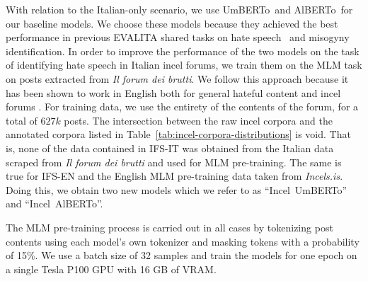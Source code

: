 \documentclass[11pt]{article}
\newcommand{\abc}[1]{{\color{blue} #1}}
\newcommand{\todoA}[1]{\todo[color=blue!40]{A: #1}}
\newcommand{\dsENclassification}{IFS-EN}
\newcommand{\dsITclassification}{IFS-IT}
\newcommand{\umbert}{\mbox{UmBERTo}}
\newcommand{\albert}{\mbox{AlBERTo}}
\newcommand{\iumbert}{\mbox{Incel UmBERTo}}
\newcommand{\ialbert}{\mbox{Incel AlBERTo}}
\newcommand{\enforum}{\textit{Incels.is}}
\newcommand{\itforum}{\textit{Il forum dei brutti}}
\begin{document}
With relation to the Italian-only scenario, we use \umbert\, and \albert\, for our baseline models. We choose these models because they achieved the best performance in previous EVALITA shared tasks on hate speech~\cite{basileEVALITA2020Overview} and misogyny~\cite{fersiniAMIEVALITA2020Automatic2020} identification.
In order to improve the performance of the two models on the task of identifying hate speech in Italian incel forums, we train them on the MLM task on posts extracted from \itforum. We follow this approach because it has been shown to work in English both for general hateful content \cite{caselli-etal-2021-hatebert} and incel forums \cite{gajo2023identification}.
For training data, we use the entirety of the contents of the forum, for a total of $627k$ posts. The intersection between the \abc{raw} %
incel corpora and the annotated corpora listed in Table~\ref{tab:incel-corpora-distributions} is void. That is, none of the data contained in \dsITclassification{} was obtained from the Italian data scraped from \itforum{} and used for MLM pre-training. The same is true for \dsENclassification{} and the English MLM pre-training data taken from \enforum.
Doing this, we obtain two new models which we refer to as ``\iumbert'' and ``\ialbert''.

The MLM pre-training process is carried out in all cases by tokenizing post contents using each model's own tokenizer and masking tokens with a probability of 15\%. We use a batch size of 32 samples and train the models for one epoch on a single Tesla P100 GPU with 16 GB of VRAM.
\end{document}
